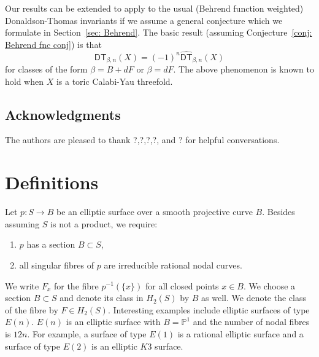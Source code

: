 \documentclass{amsart}
\theoremstyle{definition}
\newcommand{\PP} {\mathbb{P}}
\newcommand{\DT}{\mathsf{DT}}
\newcommand{\DThat}{\widehat{\DT}}
\begin{document}
Our results can be extended to apply to the usual (Behrend function
weighted) Donaldson-Thomas invariants if we assume a general
conjecture which we formulate in Section~\ref{sec: Behrend}. The basic
result (assuming Conjecture~\ref{conj: Behrend fnc conj}) is that 
\[
\DT_{\beta ,n}(X) = (-1)^{n}\DThat_{\beta ,n}(X)
\]
for classes of the form $\beta =B+dF$ or $\beta =dF$. The above
phenomenon is known to hold when $X$ is a toric Calabi-Yau threefold.

\subsection{Acknowledgments}
The authors are pleased to thank ?,?,?,?, and ? for helpful conversations.

\section{Definitions}

Let $p : S \rightarrow B$ be an elliptic surface over a smooth projective curve $B$. Besides assuming $S$ is not a product, we require:
\begin{enumerate}
\item $p$ has a section $B \subset S$,
\item all singular fibres of $p$ are irreducible rational nodal curves. 
\end{enumerate}
We write $F_x$ for the fibre $p^{-1}(\{x\})$ for all closed points $x
\in B$. We choose a section $B \subset S$ and denote its class in
$H_2(S)$ by $B$ as well. We denote the class of the fibre by $F \in
H_2(S)$. Interesting examples include elliptic surfaces of type
$E(n)$. $E(n)$ is an elliptic surface with $B = \PP^1$ and the number
of nodal fibres is $12n$. For example, a surface of type $E(1)$ is a
rational elliptic surface and a surface of type $E(2)$ is an elliptic
$K3$ surface.
\end{document}
